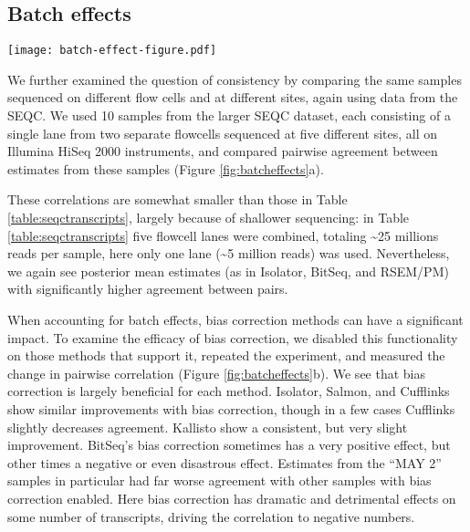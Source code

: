 \documentclass[twocolumn]{article}
\begin{document}
\subsection{Batch effects}\label{batch-effects}

\begin{figure*}
\texttt{[image: batch-effect-figure.pdf]}
\caption{
\textbf{a} A heatmap showing pairwise proportionality correlation between
samples sequenced on two flowcells each at five sites, from centrally prepared
libraries. Flowcells are numbered arbitrarily 1 or 2 and sequencing sites are
abbreviated with three letter codes: Australian Genome Research Facility (AGR),
Beijing Genome Institute (BGI), Cornell University (CNL), Mayo Clinic (MAY), and
Novartis (NVS). \textbf{b} The absolute change in correlation induced by
enabling bias correction for methods that support it. For clarity this plot
excludes points for BitSeq estimates of "MAY 2", as bias correction has an
extremely detrimental effect on these. Mean improvement in correlation was 0.008
with Salmon, 0.007 with Cufflinks, 0.006 with Isolator, 0.003 with Kallisto,
0.002 with eXpress, and -0.164 with BitSeq.
}

\label{fig:batcheffects}
\end{figure*}

We further examined the question of consistency by comparing the same
samples sequenced on different flow cells and at different sites, again
using data from the SEQC. We used 10 samples from the larger SEQC
dataset, each consisting of a single lane from two separate
flowcells sequenced at five different sites, all on Illumina HiSeq 2000
instruments, and compared pairwise agreement between estimates from these
samples (Figure \ref{fig:batcheffects}a).

These correlations are somewhat smaller than those in Table
\ref{table:seqctranscripts}, largely because of shallower sequencing: in Table
\ref{table:seqctranscripts} five flowcell lanes were combined, totaling
\textasciitilde{}25 millions reads per sample, here only one lane
(\textasciitilde{}5 million reads) was used. Nevertheless, we again see
posterior mean estimates (as in Isolator, BitSeq, and RSEM/PM) with
significantly higher agreement between pairs.

When accounting for batch effects, bias correction methods can have a
significant impact. To examine the efficacy of bias correction, we disabled this
functionality on those methods that support it, repeated the experiment, and
measured the change in pairwise correlation (Figure \ref{fig:batcheffects}b). We
see that bias correction is largely beneficial for each method. Isolator,
Salmon, and Cufflinks show similar improvements with bias correction, though in
a few cases Cufflinks slightly decreases agreement. Kallisto show a consistent,
but very slight improvement. BitSeq's bias correction sometimes has a very
positive effect, but other times a negative or even disastrous effect. Estimates
from the ``MAY 2'' samples in particular had far worse agreement with other
samples with bias correction enabled. Here bias correction has dramatic and
detrimental effects on some number of transcripts, driving the correlation to
negative numbers.
\end{document}
